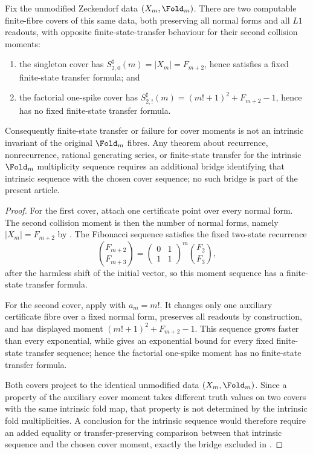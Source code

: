 \begin{theorem}
\label{thm:L2-two-cover-intrinsic-boundary}
Fix the unmodified Zeckendorf data \((X_m,\Fold_m)\).  There are two computable
finite-fibre covers of this same data, both preserving all normal forms and all
\(L1\) readouts, with opposite finite-state-transfer behaviour for their second
collision moments:
\begin{enumerate}
\item the singleton cover has
  \(S_{2,0}^\sharp(m)=\lvert X_m\rvert=F_{m+2}\), hence satisfies a fixed
  finite-state transfer formula; and
\item the factorial one-spike cover has
  \(S_{2,!}^\sharp(m)=(m!+1)^2+F_{m+2}-1\), hence has no fixed finite-state
  transfer formula.
\end{enumerate}
Consequently finite-state transfer or failure for cover moments is not an
intrinsic invariant of the original \(\Fold_m\) fibres.  Any theorem about
recurrence, nonrecurrence, rational generating series, or finite-state transfer
for the intrinsic \(\Fold_m\) multiplicity sequence requires an additional bridge
identifying that intrinsic sequence with the chosen cover sequence; no such
bridge is part of the present article.
\end{theorem}

\begin{proof}
For the first cover, attach one certificate point over every normal form.  The
second collision moment is then the number of normal forms, namely
\(\lvert X_m\rvert=F_{m+2}\) by .  The Fibonacci
sequence satisfies the fixed two-state recurrence
\[
  \binom{F_{m+2}}{F_{m+3}}
  =
  \begin{pmatrix}0&1\\ 1&1\end{pmatrix}^{m}
  \binom{F_2}{F_3},
\]
after the harmless shift of the initial vector, so this moment sequence has a
finite-state transfer formula.

For the second cover, apply  with
\(a_m=m!\).  It changes only one auxiliary certificate fibre over a fixed normal
form, preserves all readouts by construction, and has displayed moment
\((m!+1)^2+F_{m+2}-1\).  This sequence grows faster than every exponential, while
 gives an exponential bound for every
fixed finite-state transfer sequence; hence the factorial one-spike moment has
no finite-state transfer formula.

Both covers project to the identical unmodified data \((X_m,\Fold_m)\).  Since a
property of the auxiliary cover moment takes different truth values on two
covers with the same intrinsic fold map, that property is not determined by the
intrinsic fold multiplicities.  A conclusion for the intrinsic sequence would
therefore require an added equality or transfer-preserving comparison between
that intrinsic sequence and the chosen cover moment, exactly the bridge excluded
in .
\end{proof}

